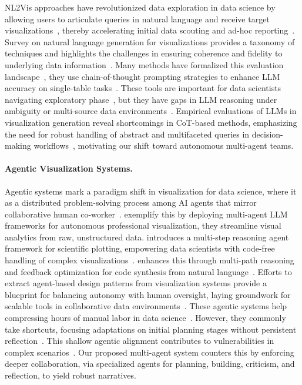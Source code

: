 \documentclass[11pt, a4paper, logo, copyright]{googlecloud}
\begin{document}
NL2Vis approaches have revolutionized data exploration in data science by allowing users to articulate queries in natural language and receive target visualizations~\citep{wang2023natural,shen2022towards,wu2024automated}, thereby accelerating initial data scouting and ad-hoc reporting~\citep{voigt-etal-2022-survey}. 
Survey on natural language generation for visualizations provides a taxonomy of techniques and highlights the challenges in ensuring coherence and fidelity to underlying data information~\citep{hoque2025natural}. Many methods have formalized this evaluation landscape~\citep{chen2024viseval,ouyang2025nvagent,bai2025text,shin2025visualizationary}, they use chain-of-thought prompting strategies to enhance LLM accuracy on single-table tasks~\citep{liu2025make}. These tools are important for data scientists navigating exploratory phase~\citep{zhang2025exploring,chen2025ai4research}, but they have gaps in LLM reasoning under ambiguity or multi-source data environments~\citep{zhu2025open,davila2025beyond}. Empirical evaluations of LLMs in visualization generation reveal shortcomings in CoT-based methods, emphasizing the need for robust handling of abstract and multifaceted queries in decision-making workflows~\citep{khan2025evaluating}, motivating our shift toward autonomous multi-agent teams.
\vspace{-5pt}
\paragraph{Agentic Visualization Systems.}

Agentic systems mark a paradigm shift in visualization for data science, where it as a distributed problem-solving process among AI agents that mirror collaborative human co-worker~\citep{sapkota2025ai,tran2025multi,wolter2025multi,10.1145/3712335.3712410}.
\citep{goswami2025plotgen,zhang2025data} exemplify this by deploying multi-agent LLM frameworks for autonomous professional visualization, they streamline visual analytics from raw, unstructured data.
\citeauthor{yang2024matplotagent} introduces a multi-step reasoning agent framework for scientific plotting, empowering data scientists with code-free handling of complex visualizations~\citep{yang2024matplotagent}. 
\citeauthor{seo2025automated} enhances this through multi-path reasoning and feedback optimization for code synthesis from natural language~\citep{seo2025automated}. 
Efforts to extract agent-based design patterns from visualization systems provide a blueprint for balancing autonomy with human oversight, laying groundwork for scalable tools in collaborative data environments~\citep{dhanoa2025agentic}.
These agentic systems help compressing hours of manual labor in data science~\citep{moss2025ai,gridach2025agentic}. However, they commonly take shortcuts, focusing adaptations on initial planning stages without persistent reflection~\citep{wang2025ai,sapkota2025ai}. This shallow agentic alignment contributes to vulnerabilities in complex scenarios~\citep{cemri2025multi,tian2025outlook}. 
Our proposed multi-agent system counters this by enforcing deeper collaboration, via specialized agents for planning, building, criticism, and reflection, to yield robust narratives. 
\end{document}
